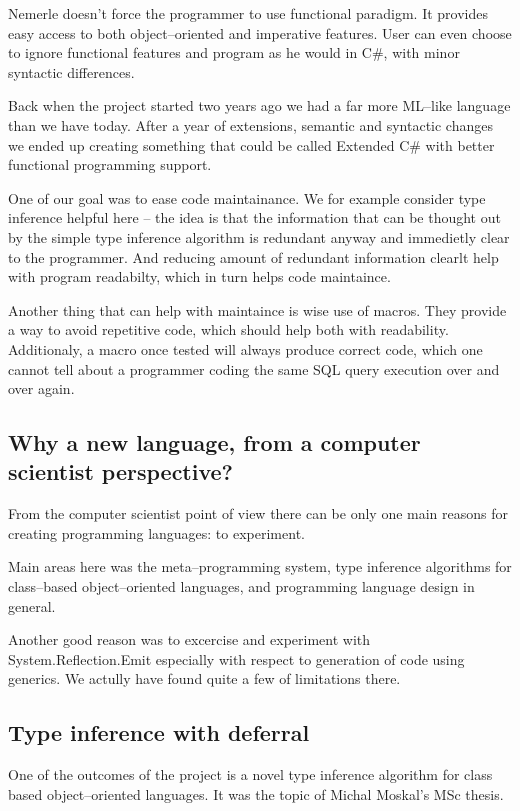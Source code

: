 \documentclass{article}
\begin{document}
Nemerle doesn't force the programmer to use functional paradigm. It provides
easy access to both object--oriented and imperative features. User
can even choose to ignore functional features and program as he would
in C\#, with minor syntactic differences.

Back when the project started two years ago we had a far more ML--like
language than we have today. After a year of extensions, semantic and
syntactic changes we ended up creating something that could be called
Extended C\# with better functional programming support.

One of our goal was to ease code maintainance. We for example consider
type inference helpful here -- the idea is that the information that
can be thought out by the simple type inference algorithm is redundant
anyway and immedietly clear to the programmer. And reducing amount
of redundant information clearlt help with program readabilty, which in
turn helps code maintaince.

Another thing that can help with maintaince is wise use of macros. They
provide a way to avoid repetitive code, which should help both with
readability. Additionaly, a macro once tested will always produce correct
code, which one cannot tell about a programmer coding the same SQL 
query execution over and over again.

\subsection{Why a new language, from a computer scientist perspective?}

From the computer scientist point of view there can be only one
main reasons for creating programming languages: to experiment.

Main areas here was the meta--programming system, type inference
algorithms for class--based object--oriented languages, and programming
language design in general.

Another good reason was to excercise and experiment with 
System.Reflection.Emit especially with respect to generation
of code using generics. We actully have found quite a few of
limitations there.


\subsection{Type inference with deferral}

One of the outcomes of the project is a novel type inference algorithm
for class based object--oriented languages. It was the topic of Michal
Moskal's MSc thesis.
\end{document}
